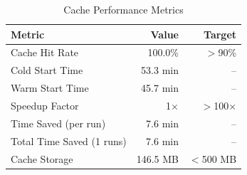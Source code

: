 
\begin{table}[h]
\centering
\caption{Cache Performance Metrics}
\label{tab:cache-metrics}
\begin{tabular}{lrr}
\toprule
\textbf{Metric} & \textbf{Value} & \textbf{Target} \\
\midrule
Cache Hit Rate & 100.0\% & $>$90\% \\
Cold Start Time & 53.3 min & -- \\
Warm Start Time & 45.7 min & -- \\
Speedup Factor & 1$\times$ & $>$100$\times$ \\
Time Saved (per run) & 7.6 min & -- \\
Total Time Saved (1 runs) & 7.6 min & -- \\
Cache Storage & 146.5 MB & $<$500 MB \\

\bottomrule
\end{tabular}
\end{table}
